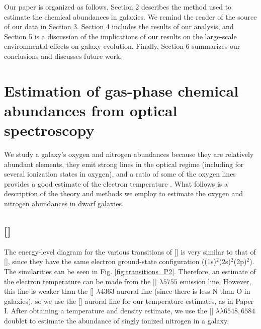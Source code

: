 Our paper is organized as follows.  Section 2 describes the method used to 
estimate the chemical abundances in galaxies.  We remind the reader of the 
source of our data in Section 3.  Section 4 includes the results of our analysis, 
and Section 5 is a discussion of the implications of our results on the 
large-scale environmental effects on galaxy evolution.  Finally, Section 6 
summarizes our conclusions and discusses future work.


%
%
\section[Calculating N/H \& N/O]{Estimation of gas-phase chemical abundances from optical spectroscopy}
\label{sec:Theory}

We study a galaxy's oxygen and nitrogen abundances because they are relatively 
abundant elements, they emit strong lines in the optical regime (including for 
several ionization states in oxygen), and a ratio of some of the oxygen lines 
provides a good estimate of the electron temperature \citep{Kewley02}.  What 
follows is a description of the theory and methods we employ to estimate the 
oxygen and nitrogen abundances in dwarf galaxies.


\subsection{[]}

The energy-level diagram for the various transitions of [] is very 
similar to that of [], since they have the same electron ground-state 
configuration ((1s)$^2$(2s)$^2$(2p)$^2$).  The similarities can be seen in Fig. 
\ref{fig:transitions_P2}.  Therefore, an estimate of the electron temperature can 
be made from the [] $\lambda 5755$ emission line.  However, this line 
is weaker than the [] $\lambda 4363$ auroral line (since there is less 
N than O in galaxies), so we use the [] auroral line for our 
temperature estimates, as in Paper I.  After obtaining a temperature and density 
estimate, we use the [] $\lambda \lambda 6548, 6584$ doublet to 
estimate the abundance of singly ionized nitrogen in a galaxy.

